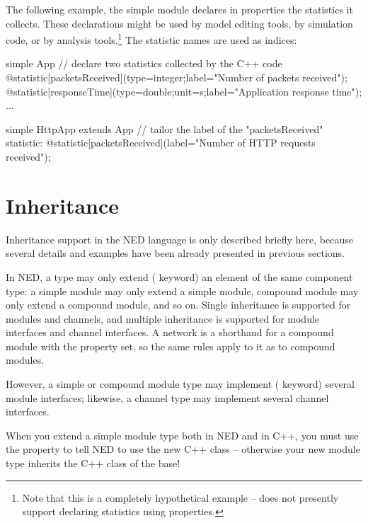 The following example, the simple module declares in properties the
statistics it collects. These declarations might be used by model editing
tools, by simulation code, or by analysis tools.\footnote{Note that this is
a completely hypothetical example -- {\opp} does not presently support
declaring statistics using properties.} The statistic names are
used as indices:

\begin{ned}
simple App {
    // declare two statistics collected by the C++ code
    @statistic[packetsReceived](type=integer;label="Number of packets received");
    @statistic[responseTime](type=double;unit=s;label="Application response time");
    ...
}

simple HttpApp extends App {
    // tailor the label of the "packetsReceived" statistic:
    @statistic[packetsReceived](label="Number of HTTP requests received");
}
\end{ned}



\section{Inheritance}
\label{sec:ch-ned-lang:inheritance}

Inheritance support in the NED language is only described briefly here,
because several details and examples have been already presented in
previous sections.

In NED, a type may only extend ( keyword) an element of
the same component type: a simple module may only extend a simple module,
compound module may only extend a compound module, and so on. Single
inheritance is supported for modules and channels, and multiple inheritance
is supported for module interfaces and channel interfaces. A network is a
shorthand for a compound module with the  property set, so
the same rules apply to it as to compound modules.

However, a simple or compound module type may implement (
keyword) several module interfaces; likewise, a channel type may implement
several channel interfaces.

\begin{important}
    When you extend a simple module type both in NED and in C++, you must
    use the  property to tell NED to use the new C++ class --
    otherwise your new module type inherits the C++ class of the base!
\end{important}


